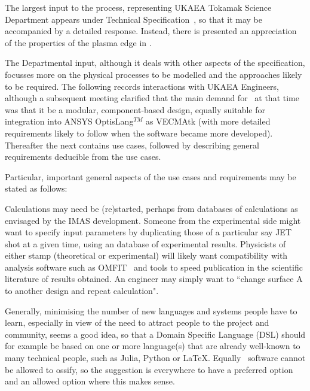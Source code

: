 
The largest input to the process, representing UKAEA Tokamak Science
Department appears under Technical Specification~, so that it may
be accompanied by a detailed response. Instead, there is presented an appreciation
of the properties of the plasma edge in .

The Departmental input, although it deals with other aspects of the specification,
focusses more on the physical processes to be modelled and the approaches likely to
be required. The following  records interactions with UKAEA Engineers, although
a subsequent meeting clarified that the main demand for \nep\ at that time was that it be a
modular, component-based design, equally suitable for integration into ANSYS OptisLang$^{TM}$
as VECMAtk (with more detailed requirements likely to follow when the software became more developed).
Thereafter the  next   contains use cases, followed by 
describing general requirements deducible from the use cases.










Particular, important general aspects of the use cases and  requirements may be
stated as follows:

Calculations may need be (re)started, perhaps from databases of calculations as envisaged by the 
IMAS development.  Someone from the experimental side might want to specify input parameters
by duplicating those of a particular say JET 
shot at a given time, using an database of experimental results.
Physicists of either stamp (theoretical or experimental) will likely want compatibility with
analysis software such as OMFIT~\cite{omfitwebsite} and tools to speed publication in
the scientific literature of results obtained.
An engineer may simply want to ``change surface A to another design and repeat calculation".

Generally, minimising the number of new languages and systems people have to learn, especially
in view of the need to attract people to the project and community, seems a good idea, so that
a Domain Specific Language (DSL) should for
example be based on one or more language(s) that are already well-known to many technical people,
such as Julia, Python or \LaTeX.
Equally \nep \ software cannot be allowed to ossify, so the suggestion 
is everywhere to have a preferred option and an allowed option where this makes sense.
